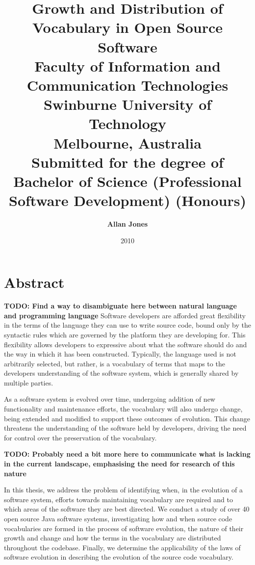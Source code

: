\title{ \huge{\textbf{Growth and Distribution of Vocabulary in Open Source Software}} \\[1.2cm]
\large{Faculty of Information and Communication Technologies\\
Swinburne University of Technology\\
Melbourne, Australia\\}
\vspace{1.2cm} 
\large{Submitted for the degree of Bachelor of Science (Professional Software Development) (Honours)} \\
\vspace{1cm} 
} 
\author{ \Large{\textbf{Allan Jones}} } 
\date{2010} 
\maketitle

\newpage 
{}
\chapter*{Abstract}
\vspace{-0.75cm}

\textbf{TODO: Find a way to disambiguate here between natural language and programming language}
Software developers are afforded great flexibility in the terms of the language they can use to write source code, bound only by the syntactic rules which are governed by the platform they are developing for. This flexibility allows developers to expressive about what the software should do and the way in which it has been constructed. Typically, the language used is not arbitrarily selected, but rather, is a vocabulary of terms that maps to the developers understanding of the software system, which is generally shared by multiple parties.

As a software system is evolved over time, undergoing addition of new functionality and maintenance efforts, the vocabulary will also undergo change, being extended and modified to support these outcomes of evolution. This change threatens the understanding of the software held by developers, driving the need for control over the preservation of the vocabulary.

\textbf{TODO: Probably need a bit more here to communicate what is lacking in the current landscape, emphasising the need for research of this nature}

In this thesis, we address the problem of identifying when, in the evolution of a software system, efforts towards maintaining vocabulary are required and to which areas of the software they are best directed. We conduct a study of over 40 open source Java software systems, investigating how and when source code vocabularies are formed in the process of software evolution, the nature of their growth and change and how the terms in the vocabulary are distributed throughout the codebase. Finally, we determine the applicability of the laws of software evolution in describing the evolution of the source code vocabulary. 

